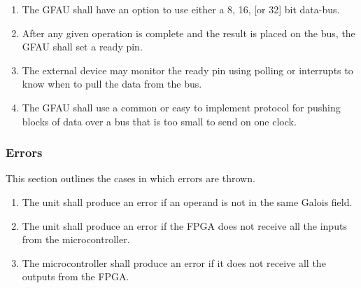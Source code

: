 \documentclass[paper=usletter, fontsize=12pt]{article}
\begin{document}
        \begin{enumerate}
            
            \item The GFAU shall have an option to use either a 8, 16, [or 32] bit data-bus.
            
            \item After any given operation is complete and the result is placed on the bus, the GFAU shall set a ready pin. 
            
            \item The external device may monitor the ready pin using polling or interrupts to know when to pull the data from the bus.
            
            \item The GFAU shall use a common or easy to implement protocol for pushing blocks of data over a bus that is too small to send on one clock.

        \end{enumerate}

            \subsubsection{Errors}
            This section outlines the cases in which errors are thrown.
            \begin{enumerate}

                \item The unit shall produce an error if an operand is not in the same Galois field.

                \item The unit shall produce an error if the FPGA does not receive all the inputs from the microcontroller.

                \item The microcontroller shall produce an error if it does not receive all the outputs from the FPGA.

            \end{enumerate}
\end{document}
